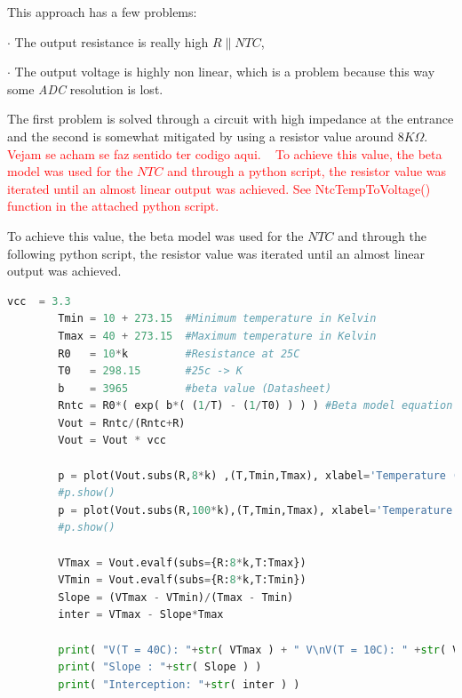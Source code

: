 \documentclass[12pt]{article}
\begin{document}
    This approach  has a few problems: 

    $\cdot$ The output resistance is really high $R\parallel NTC$, 

    $\cdot$ The output voltage is highly non linear, which is a problem because this way some \textit{ADC} resolution is lost.

    The first problem is solved through a circuit with high impedance at the entrance and the second is somewhat mitigated by using a resistor value around $8K \Omega$. 
    \textcolor{red}{Vejam se acham se faz sentido ter codigo aqui. ~ To achieve this value, the beta model was used for the $NTC$ and through a python script, the resistor value was iterated until an almost linear output was achieved. See NtcTempToVoltage() function in the attached python script.}
    
    To achieve this value, the beta model was used for the $NTC$ and through the following python script, the resistor value was iterated until an almost linear output was achieved. 

    \begin{lstlisting}[language=Python]
        vcc  = 3.3 
        Tmin = 10 + 273.15  #Minimum temperature in Kelvin
        Tmax = 40 + 273.15  #Maximum temperature in Kelvin
        R0   = 10*k         #Resistance at 25C
        T0   = 298.15       #25c -> K
        b    = 3965         #beta value (Datasheet)
        Rntc = R0*( exp( b*( (1/T) - (1/T0) ) ) ) #Beta model equation
        Vout = Rntc/(Rntc+R)
        Vout = Vout * vcc
        
        p = plot(Vout.subs(R,8*k) ,(T,Tmin,Tmax), xlabel='Temperature (K)', ylabel='$V_{out}$', title='Output Voltage vs Temperature (8k$\\Omega$)',show=False,axis_center=(282,1.3))
        #p.show()
        p = plot(Vout.subs(R,100*k),(T,Tmin,Tmax), xlabel='Temperature (K)', ylabel='$V_{out}$', title='Output Voltage vs Temperature (100k$\\Omega$)',show=False,axis_center=(282,0.15))
        #p.show()

        VTmax = Vout.evalf(subs={R:8*k,T:Tmax})
        VTmin = Vout.evalf(subs={R:8*k,T:Tmin})
        Slope = (VTmax - VTmin)/(Tmax - Tmin)
        inter = VTmax - Slope*Tmax

        print( "V(T = 40C): "+str( VTmax ) + " V\nV(T = 10C): " +str( VTmin )+" V" )
        print( "Slope : "+str( Slope ) )
        print( "Interception: "+str( inter ) )
        
    \end{lstlisting}
    ~
    
\end{document}
